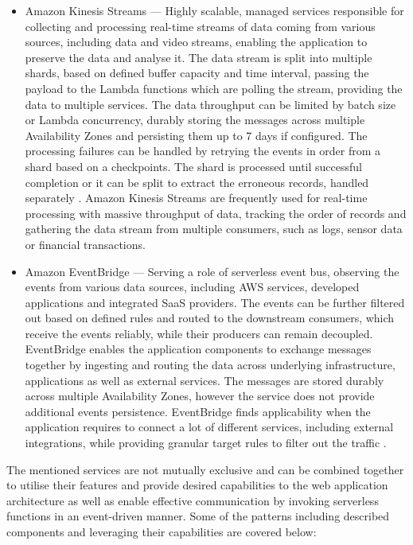 \begin{itemize}
   \item Amazon Kinesis Streams ---
   Highly scalable, managed services responsible for collecting and processing real-time streams of data coming from various sources, including data and video streams, enabling the application to preserve the data and analyse it.
   The data stream is split into multiple shards, based on defined buffer capacity and time interval, passing the payload to the Lambda functions which are polling the stream, providing the data to multiple services.
   The data throughput can be limited by batch size or Lambda concurrency, durably storing the messages across multiple Availability Zones and persisting them up to 7 days if configured.
   The processing failures can be handled by retrying the events in order from a shard based on a checkpoints.
   The shard is processed until successful completion or it can be split to extract the erroneous records, handled separately \cite{ChoosingEventsQueuesTopicsAndStreamsInYourServerlessApplication}.
   Amazon Kinesis Streams are frequently used for real-time processing with massive throughput of data, tracking the order of records and gathering the data stream from multiple consumers, such as logs, sensor data or financial transactions.
  
   \item Amazon EventBridge ---
   Serving a role of serverless event bus, observing the events from various data sources, including AWS services, developed applications and integrated SaaS providers. The events can be further filtered out based on defined rules and routed to the downstream consumers, which receive the events reliably, while their producers can remain decoupled.
   EventBridge enables the application components to exchange messages together by ingesting and routing the data across underlying infrastructure, applications as well as external services.
   The messages are stored durably across multiple Availability Zones, however the service does not provide additional events persistence.
   EventBridge finds applicability when the application requires to connect a lot of different services, including external integrations, while providing granular target rules to filter out the traffic \cite{ChoosingEventsQueuesTopicsAndStreamsInYourServerlessApplication}.
\end{itemize}

The mentioned services are not mutually exclusive and can be combined together to utilise their features and provide desired capabilities to the web application architecture as well as enable effective communication by invoking serverless functions in an event-driven manner.
Some of the patterns including described components and leveraging their capabilities are covered below:

